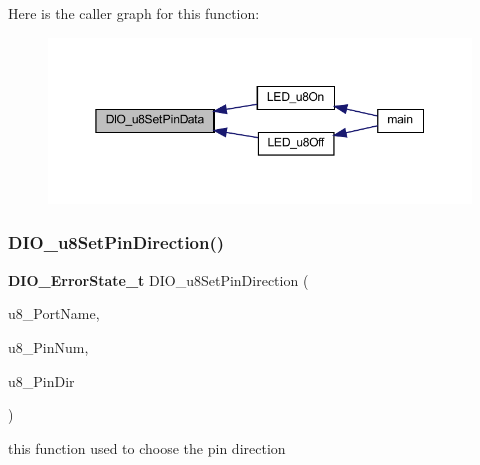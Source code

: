 Here is the caller graph for this function\+:\nopagebreak
\begin{figure}[H]
\begin{center}
\leavevmode
\includegraphics[width=350pt]{_d_i_o__interface_8h_afd3ecd8f36ed8d5af71a1cc1e7951c57_icgraph}
\end{center}
\end{figure}
\mbox{\label{_d_i_o__interface_8h_ac0ce7d6cfdca971c649a94cfaccfb292}} 
\subsubsection{D\+I\+O\+\_\+u8\+Set\+Pin\+Direction()}
{\footnotesize\ttfamily \textbf{ D\+I\+O\+\_\+\+Error\+State\+\_\+t} D\+I\+O\+\_\+u8\+Set\+Pin\+Direction (\begin{DoxyParamCaption}\item[{\textbf{ D\+I\+O\+Port\+\_\+t}}]{u8\+\_\+\+Port\+Name,  }\item[{\textbf{ D\+I\+O\+Pin\+\_\+t}}]{u8\+\_\+\+Pin\+Num,  }\item[{\textbf{ D\+I\+O\+Dir\+\_\+t}}]{u8\+\_\+\+Pin\+Dir }\end{DoxyParamCaption})}



this function used to choose the pin direction 


